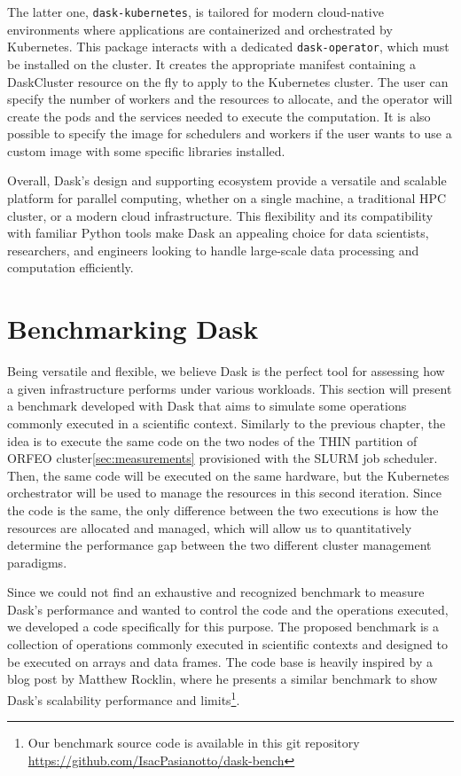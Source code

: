 The latter one, \texttt{dask-kubernetes}, is tailored for modern cloud-native
environments where applications are containerized and orchestrated by
Kubernetes.
This package interacts with a dedicated \texttt{dask-operator}, which must be
installed on the cluster.
It creates the appropriate manifest containing a DaskCluster resource on the fly
to apply to the Kubernetes cluster.
The user can specify the number of workers and the resources to allocate, and
the operator will create the pods and the services needed to execute the
computation.
It is also possible to specify the image for schedulers and workers if the user
wants to use a custom image with some specific libraries installed.

Overall, Dask's design and supporting ecosystem provide a versatile and scalable
platform for parallel computing, whether on a single machine, a traditional HPC
cluster, or a modern cloud infrastructure.
This flexibility and its compatibility with familiar Python tools make Dask an
appealing choice for data scientists, researchers, and engineers looking to
handle large-scale data processing and computation efficiently.

\section{Benchmarking Dask}\label{sec:daskbenchmark}

Being versatile and flexible, we believe Dask is the perfect tool for assessing
how a given infrastructure performs under various workloads.
This section will present a benchmark developed with Dask that aims to simulate
some operations commonly executed in a scientific context.
Similarly to the previous chapter, the idea is to execute the same code on the
two nodes of the THIN partition of ORFEO cluster\ref{sec:measurements}
provisioned with the SLURM job scheduler.
Then, the same code will be executed on the same hardware, but the Kubernetes
orchestrator will be used to manage the resources in this second iteration.
Since the code is the same, the only difference between the two executions is
how the resources are allocated and managed, which will allow us to
quantitatively determine the performance gap between the two different cluster
management paradigms.

Since we could not find an exhaustive and recognized benchmark to measure Dask's
performance and wanted to control the code and the operations executed, we
developed a code specifically for this purpose.
The proposed benchmark is a collection of operations commonly executed in
scientific contexts and designed to be executed on arrays and data frames.
The code base is heavily inspired by a blog post by Matthew Rocklin, where he
presents a similar benchmark to show Dask's scalability performance and
limits\cite{Rocklinblog}\footnote{
  Our benchmark source code is available in this git repository
  \url{https://github.com/IsacPasianotto/dask-bench}
}.

